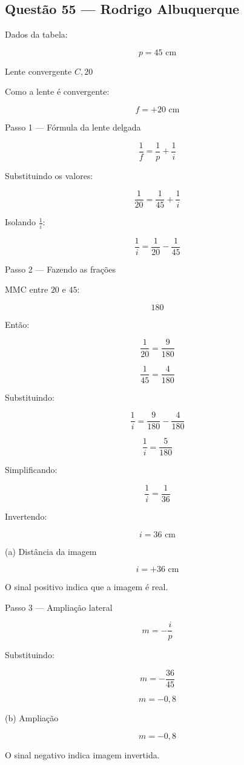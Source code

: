 \documentclass[12pt,a4paper]{article}
\begin{document}
\subsection{Questão 55 — Rodrigo Albuquerque}

Dados da tabela:

\[
p = 45\text{ cm}
\]

Lente convergente \(C,20\)

Como a lente é convergente:

\[
f = +20\text{ cm}
\]

Passo 1 — Fórmula da lente delgada

\[
\frac{1}{f} = \frac{1}{p} + \frac{1}{i}
\]

Substituindo os valores:

\[
\frac{1}{20} = \frac{1}{45} + \frac{1}{i}
\]

Isolando \(\frac{1}{i}\):

\[
\frac{1}{i} = \frac{1}{20} - \frac{1}{45}
\]

Passo 2 — Fazendo as frações

MMC entre \(20\) e \(45\):

\[
180
\]

Então:

\[
\frac{1}{20} = \frac{9}{180}
\]

\[
\frac{1}{45} = \frac{4}{180}
\]

Substituindo:

\[
\frac{1}{i} = \frac{9}{180} - \frac{4}{180}
\]

\[
\frac{1}{i} = \frac{5}{180}
\]

Simplificando:

\[
\frac{1}{i} = \frac{1}{36}
\]

Invertendo:

\[
i = 36\text{ cm}
\]

(a) Distância da imagem

\[
\boxed{i = +36\text{ cm}}
\]

O sinal positivo indica que a imagem é real.

Passo 3 — Ampliação lateral

\[
m = -\frac{i}{p}
\]

Substituindo:

\[
m = -\frac{36}{45}
\]

\[
m = -0,8
\]

(b) Ampliação

\[
\boxed{m = -0,8}
\]

O sinal negativo indica imagem invertida.
\end{document}
